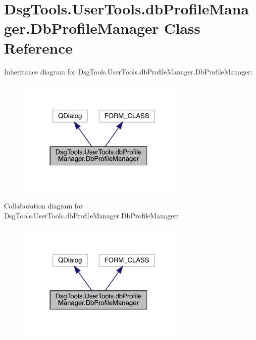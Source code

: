 \hypertarget{class_dsg_tools_1_1_user_tools_1_1db_profile_manager_1_1_db_profile_manager}{}\section{Dsg\+Tools.\+User\+Tools.\+db\+Profile\+Manager.\+Db\+Profile\+Manager Class Reference}
\label{class_dsg_tools_1_1_user_tools_1_1db_profile_manager_1_1_db_profile_manager}


Inheritance diagram for Dsg\+Tools.\+User\+Tools.\+db\+Profile\+Manager.\+Db\+Profile\+Manager\+:
\nopagebreak
\begin{figure}[H]
\begin{center}
\leavevmode
\includegraphics[width=238pt]{class_dsg_tools_1_1_user_tools_1_1db_profile_manager_1_1_db_profile_manager__inherit__graph}
\end{center}
\end{figure}


Collaboration diagram for Dsg\+Tools.\+User\+Tools.\+db\+Profile\+Manager.\+Db\+Profile\+Manager\+:
\nopagebreak
\begin{figure}[H]
\begin{center}
\leavevmode
\includegraphics[width=238pt]{class_dsg_tools_1_1_user_tools_1_1db_profile_manager_1_1_db_profile_manager__coll__graph}
\end{center}
\end{figure}
